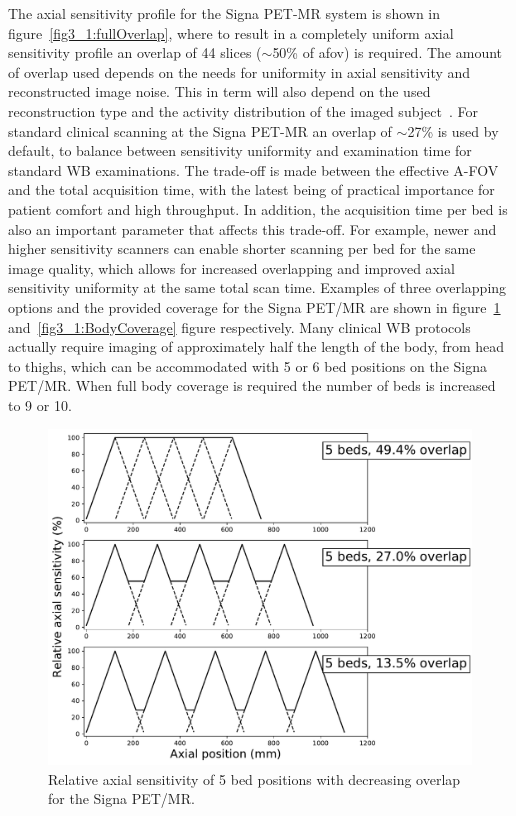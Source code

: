 %
The axial sensitivity profile for the Signa PET-MR system is shown in figure~\ref{fig3_1:fullOverlap}, where to result in a completely uniform axial sensitivity profile an overlap of 44 slices ($\sim$50\% of \gls{afov}) is required.
The amount of overlap used depends on the needs for uniformity in axial sensitivity and reconstructed image noise. This in term will also depend on the used reconstruction type and the activity distribution of the imaged subject~\cite{Schubert1996}. 
For standard clinical scanning at the Signa PET-MR an overlap of $\sim$27\% is used by default, to balance between sensitivity uniformity and examination time for standard WB examinations. The trade-off is made between the effective A-FOV and the total acquisition time, with the latest being of practical importance for patient comfort and high throughput. In addition, the acquisition time per bed is also an important parameter that affects this trade-off. For example, newer and higher sensitivity scanners can enable shorter scanning per bed for the same image quality, which allows for increased overlapping and improved axial sensitivity uniformity at the same total scan time.
Examples of three overlapping options and the provided coverage for the Signa PET/MR are shown in figure~\ref{fig3_1:decreasingOverlap} and~\ref{fig3_1:BodyCoverage} figure respectively.
Many clinical WB protocols actually require imaging of approximately half the length of the body, from head to thighs, which can be accommodated with 5 or 6 bed positions on the Signa PET/MR. When full body coverage is required the number of beds is increased to 9 or 10. %
%
\begin{figure} [ht!]
\centering
\includegraphics[scale=0.5,angle=0]{2_Theory_Methods/figures/SensitivityProfiles_3Options.pdf}
\caption{Relative axial sensitivity of 5 bed positions with decreasing overlap for the Signa PET/MR.} 
\label{fig3_1:decreasingOverlap}
\end{figure}
